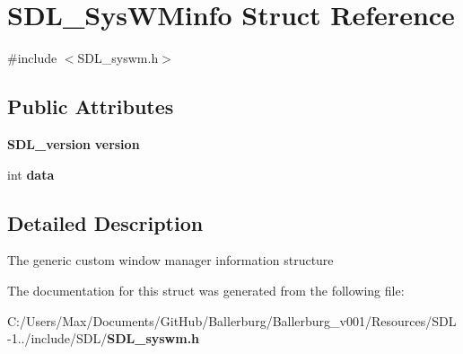 \section{S\+D\+L\+\_\+\+Sys\+W\+Minfo Struct Reference}
\label{struct_s_d_l___sys_w_minfo}


{\ttfamily \#include $<$S\+D\+L\+\_\+syswm.\+h$>$}

\subsection*{Public Attributes}
\begin{DoxyCompactItemize}
\item 
{\bf S\+D\+L\+\_\+version} {\bfseries version}\label{struct_s_d_l___sys_w_minfo_ac3a70af022d4849e9ff546595e94627f}

\item 
int {\bfseries data}\label{struct_s_d_l___sys_w_minfo_ac69151baa9187a402f9f9e4ce9ed7c8a}

\end{DoxyCompactItemize}


\subsection{Detailed Description}
The generic custom window manager information structure 

The documentation for this struct was generated from the following file\+:\begin{DoxyCompactItemize}
\item 
C\+:/\+Users/\+Max/\+Documents/\+Git\+Hub/\+Ballerburg/\+Ballerburg\+\_\+v001/\+Resources/\+S\+D\+L-\/1../include/\+S\+D\+L/{\bf S\+D\+L\+\_\+syswm.\+h}\end{DoxyCompactItemize}
